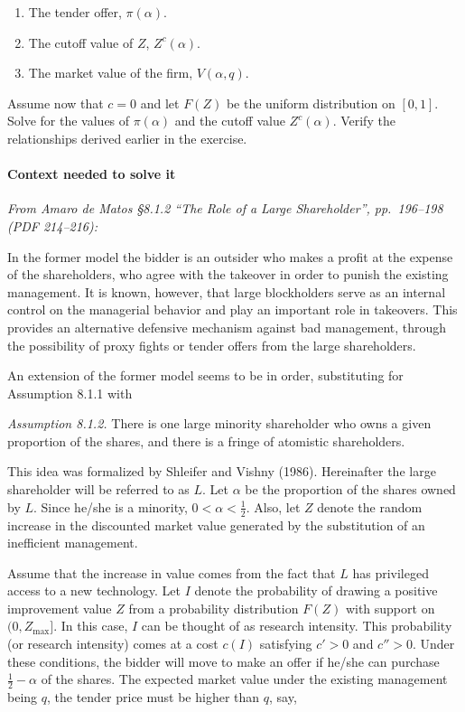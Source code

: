 \documentclass[11pt,a4paper]{article}
\begin{document}
\begin{enumerate}
\def\labelenumi{(\alph{enumi})}
\item
  The tender offer, \(\pi(\alpha)\).
\item
  The cutoff value of \(Z\), \(Z^c(\alpha)\).
\item
  The market value of the firm, \(V(\alpha, q)\).
\end{enumerate}

Assume now that \(c = 0\) and let \(F(Z)\) be the uniform distribution on \([0, 1]\). Solve for the
values of \(\pi(\alpha)\) and the cutoff value \(Z^c(\alpha)\). Verify the relationships derived
earlier in the exercise.

\paragraph{Context needed to solve it}

\emph{From Amaro de Matos §8.1.2 ``The Role of a Large Shareholder'', pp.~196--198 (PDF 214--216):}

In the former model the bidder is an outsider who makes a profit at the expense of the shareholders,
who agree with the takeover in order to punish the existing management. It is known, however, that
large blockholders serve as an internal control on the managerial behavior and play an important
role in takeovers. This provides an alternative defensive mechanism against bad management, through
the possibility of proxy fights or tender offers from the large shareholders.

An extension of the former model seems to be in order, substituting for Assumption 8.1.1 with

\emph{Assumption 8.1.2.} There is one large minority shareholder who owns a given proportion of the
shares, and there is a fringe of atomistic shareholders.

This idea was formalized by Shleifer and Vishny (1986). Hereinafter the large shareholder will be
referred to as \(L\). Let \(\alpha\) be the proportion of the shares owned by \(L\). Since he/she is
a minority, \(0 < \alpha < \frac{1}{2}\). Also, let \(Z\) denote the random increase in the
discounted market value generated by the substitution of an inefficient management.

Assume that the increase in value comes from the fact that \(L\) has privileged access to a new
technology. Let \(I\) denote the probability of drawing a positive improvement value \(Z\) from a
probability distribution \(F(Z)\) with support on \((0, Z_{\max}]\). In this case, \(I\) can be
thought of as research intensity. This probability (or research intensity) comes at a cost \(c(I)\)
satisfying \(c' > 0\) and \(c'' > 0\). Under these conditions, the bidder will move to make an offer
if he/she can purchase \(\frac{1}{2} - \alpha\) of the shares. The expected market value under the
existing management being \(q\), the tender price must be higher than \(q\), say,
\end{document}
